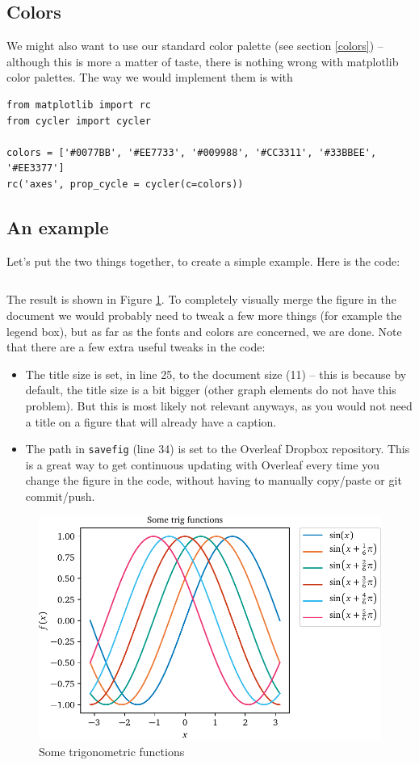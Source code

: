 \documentclass[letterpaper,11pt]{notes}
\theoremstyle{definition}
\theoremstyle{plain}
\theoremstyle{remark}
\begin{document}
\subsection{Colors}

We might also want to use our standard color palette (see section \ref{colors}) -- although this is more a matter of taste, there is nothing wrong with matplotlib color palettes. The way we would implement them is with
\begin{verbatim}
from matplotlib import rc
from cycler import cycler

colors = ['#0077BB', '#EE7733', '#009988', '#CC3311', '#33BBEE', '#EE3377']
rc('axes', prop_cycle = cycler(c=colors))
\end{verbatim}


\subsection{An example}
Let's put the two things together, to create a simple example. Here is the code:
\inputminted[linenos]{python}{fig.py}
The result is shown in Figure \ref{fig:trig}. To completely visually merge the figure in the document we would probably need to tweak a few more things (for example the legend box), but as far as the fonts and colors are concerned, we are done. Note that there are a few extra useful tweaks in the code:
\begin{itemize}
    \item The title size is set, in line 25, to the document size (11) -- this is because by default, the title size is a bit bigger (other graph elements do not have this problem). But this is most likely not relevant anyways, as you would not need a title on a figure that will already have a caption.
    \item The path in \texttt{savefig} (line 34) is set to the Overleaf Dropbox repository. This is a great way to get continuous updating with Overleaf every time you change the figure in the code, without having to manually copy/paste or git commit/push.
\end{itemize}

\begin{figure}
    \centering
    \includegraphics{trig.pdf}
    \caption{Some trigonometric functions}
    \label{fig:trig}
\end{figure}
\end{document}
